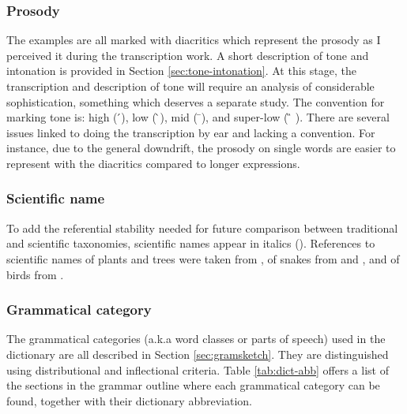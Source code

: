 \subsubsection{Prosody}
\label{sec:INT-prosody}

The examples are all marked with diacritics which represent the prosody as I 
perceived it during the transcription work. A  short description of tone and 
intonation is provided in Section \ref{sec:tone-intonation}. At this stage, the 
transcription and description of tone will require an analysis of considerable 
sophistication, something which deserves a separate study. The convention for 
marking tone is:  high (  ́), low (  ̀), mid   (  ̄),  and super-low ( ̏ ).  
There are several issues linked to doing the transcription by ear and lacking a 
convention. For instance, due to the general downdrift,  the prosody on 
single words are easier to represent with the diacritics compared to longer 
expressions.

\subsubsection{Scientific name}
\label{sec:INT-sci-name}

To  add the referential stability needed for future comparison between
traditional  and scientific  taxonomies, scientific names appear in italics  
().   References to scientific
names of  plants and trees were taken from 
\citet{hawt06},  of  snakes from \citet{Cans61}  and \citet{Trap06}, and of  
birds 
from \citet{borr02}.




\subsubsection{Grammatical category}
\label{sec:INT-other-lex-field}

The grammatical categories (a.k.a  word classes or parts of speech)  used in the 
dictionary are all described in Section \ref{sec:gramsketch}. They are 
distinguished using distributional and inflectional criteria. Table 
\ref{tab:dict-abb} offers a  list of the sections in the grammar outline where 
each grammatical  category can be found, together with their dictionary 
abbreviation.


% 
% 
% 
%     

